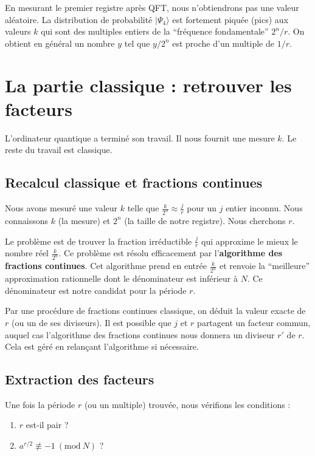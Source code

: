 \documentclass[11pt,a4paper]{article}
\newcommand{\Mod}[1]{\ (\mathrm{mod}\ #1)}
\begin{document}
En mesurant le premier registre après QFT, nous n'obtiendrons pas une valeur aléatoire. La distribution de probabilité $|\Psi_4\rangle$ est fortement piquée (pics) aux valeurs $k$ qui sont des multiples entiers de la ``fréquence fondamentale'' $2^n/r$. On obtient en général un nombre $y$ tel que $y/2^n$ est proche d'un multiple de $1/r$.

\section{La partie classique : retrouver les facteurs}

L'ordinateur quantique a terminé son travail. Il nous fournit une mesure $k$. Le reste du travail est classique.

\subsection{Recalcul classique et fractions continues}

Nous avons mesuré une valeur $k$ telle que $\frac{k}{2^n} \approx \frac{j}{r}$ pour un $j$ entier inconnu. Nous connaissons $k$ (la mesure) et $2^n$ (la taille de notre registre). Nous cherchons $r$. 

Le problème est de trouver la fraction irréductible $\frac{j}{r}$ qui approxime le mieux le nombre réel $\frac{k}{2^n}$. Ce problème est résolu efficacement par l'\textbf{algorithme des fractions continues}. Cet algorithme prend en entrée $\frac{k}{2^n}$ et renvoie la ``meilleure'' approximation rationnelle dont le dénominateur est inférieur à $N$. Ce dénominateur est notre candidat pour la période $r$.

Par une procédure de fractions continues classique, on déduit la valeur exacte de $r$ (ou un de ses diviseurs). Il est possible que $j$ et $r$ partagent un facteur commun, auquel cas l'algorithme des fractions continues nous donnera un diviseur $r'$ de $r$. Cela est géré en relançant l'algorithme si nécessaire.

\subsection{Extraction des facteurs}

Une fois la période $r$ (ou un multiple) trouvée, nous vérifions les conditions :
\begin{enumerate}
\item $r$ est-il pair ?
\item $a^{r/2} \not\equiv -1 \Mod{N}$ ?
\end{enumerate}
\end{document}
